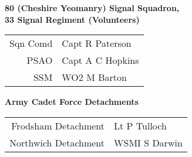 \pagebreak

\vspace*{10mm}

\begin{center}
  \Large
  \textbf{80 (Cheshire Yeomanry) Signal Squadron, \\ 33 Signal Regiment (Volunteers)}
\end{center}

\begin{center}
  \begin{tabular}{rl}
    Sqn Comd & Capt R Paterson \\
    PSAO & Capt A C Hopkins \\
    SSM & WO2 M Barton \\
  \end{tabular}
\end{center}

\vspace*{10mm}

\begin{center}
  \Large
  \textbf{Army Cadet Force Detachments}
\end{center}

\begin{center}
  \begin{tabular}{rl}
    Frodsham Detachment & Lt P Tulloch \\
    Northwich Detachment & WSMI S Darwin \\
  \end{tabular}
\end{center}
